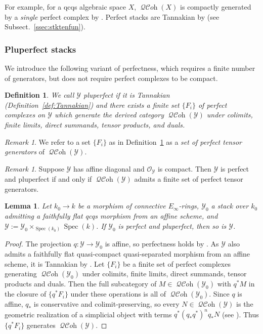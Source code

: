 \documentclass[12pt, oneside]{amsart}
\numberwithin{equation}{section}
\newtheorem{definition}[subsubsection]{Definition}
\newtheorem{lemma}[subsubsection]{Lemma}
\theoremstyle{remark}
\newtheorem{remark}[subsubsection]{Remark}
\theoremstyle{plain}
\DeclareMathOperator{\QCOH}{\mathcal{QC}\textit{oh}}
\newcommand{\OO}{\mathcal{O}}
\newcommand{\YY}{\mathcal{Y}}
\DeclareMathOperator{\spc}{Spec}
\begin{document}
For example, for a qcqs algebraic space $X$, $\QCOH(X)$ is compactly generated by a \emph{single} perfect complex by \cite[Thm.~9.6.3.2]{SAG}.
Perfect stacks are Tannakian by \cite{BHL} (see Subsect.~\ref{ssec:stktenfun}).

\subsubsection{Pluperfect stacks}

We introduce the following variant of perfectness, which requires a finite number of generators, but does not require perfect complexes to be compact.

\begin{definition} \label{def:pluperfect} We call $\YY$ \emph{pluperfect} if it is Tannakian (Definition~\ref{def:Tannakian}) and there exists a finite set $\{F_{i}\}$ of perfect complexes on $\YY$ which generate the derived category $\QCOH(\YY)$ under colimits, finite limits, direct summands, tensor products, and duals. \end{definition}

\begin{remark}
	We refer to a set $\{F_i\}$ as in Definition~\ref{def:pluperfect} as a \emph{set of perfect tensor generators} of $\QCOH(\YY)$.
\end{remark}

\begin{remark}\label{rem:perfect and pluperfect}
Suppose $\YY$ has affine diagonal and $\OO_{\YY}$ is compact.
Then $\YY$ is perfect and pluperfect if and only if $\QCOH(\YY)$ admits a finite set of perfect tensor generators.
\end{remark}

\begin{lemma}\label{lem:pluperfect base change}
  Let $k_0 \to k$ be a morphism of connective $E_\infty$-rings, $\YY_0$ a stack over $k_0$ admitting a faithfully flat qcqs morphism from an affine scheme, and $\YY := \YY_0 \times_{\spc(k_0)} \spc(k)$.
  If $\YY_0$ is perfect and pluperfect, then so is $\YY$.
\end{lemma}
\begin{proof}
  The projection $q : \YY \to \YY_0$ is affine, so perfectness holds by \cite[Prop.~3.21]{BFN}.
  As $\YY$ also admits a faithfully flat quasi-compact quasi-separated morphism from an affine scheme, it is Tannakian by \cite[Thm.~1.3]{BHL}.
  Let $\{F_i\}$ be a finite set of perfect complexes generating $\QCOH(\YY_0)$ under colimits, finite limits, direct summands, tensor products and duals.
  Then the full subcategory of $M \in \QCOH(\YY_0)$ with $q^*M$ in the closure of $\{q^*F_i\}$ under these operations is all of $\QCOH(\YY_0)$.
  Since $q$ is affine, $q_*$ is conservative and colimit-preserving, so every $N \in \QCOH(\YY)$ is the geometric realization of a simplicial object with terms $q^*(q_*q^*)^n q_*N$ (see \cite[Prop.~4.7.3.14]{LurieHA}).
  Thus $\{q^*F_i\}$ generates $\QCOH(\YY)$.
\end{proof}
\end{document}
